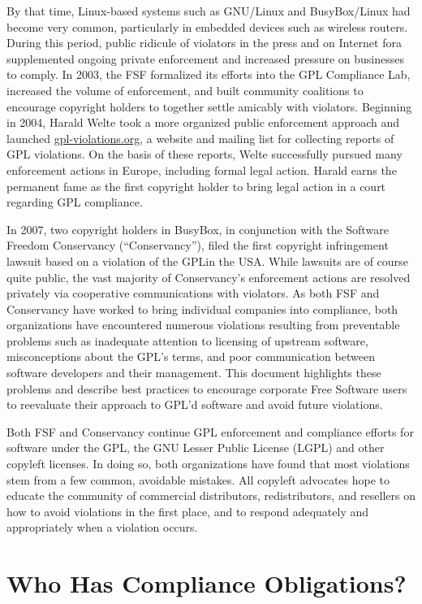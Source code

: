 By that time, Linux-based systems such as GNU/Linux and BusyBox/Linux had become very common, particularly in
embedded devices such as wireless routers.  During this period, public
ridicule of violators in the press and on Internet fora supplemented
ongoing private enforcement and increased pressure on businesses to
comply.  In 2003, the FSF formalized its efforts into the GPL Compliance
Lab, increased the volume of enforcement, and built community coalitions
to encourage copyright holders to together settle amicably with violators.
Beginning in 2004, Harald Welte took a more organized public enforcement
approach and launched \href{http://gpl-violations.org/}{gpl-violations.org}, a website and mailing
list for collecting reports of GPL violations.  On the basis of these
reports, Welte successfully pursued many enforcement actions in Europe, including
formal legal action.  Harald earns the permanent fame as the first copyright
holder to bring legal action in a court regarding GPL compliance.

In 2007, two copyright holders in BusyBox, in conjunction with the
Software Freedom Conservancy (``Conservancy''), filed the first copyright infringement lawsuit
based on a violation of the GPL\@ in the USA. While  lawsuits are of course
quite public, the vast majority of Conservancy's enforcement actions 
are resolved privately via
cooperative communications with violators.  As both FSF and Conservancy have worked to bring
individual companies into compliance, both organizations have encountered numerous
violations resulting from preventable problems such as inadequate
attention to licensing of upstream software, misconceptions about the
GPL's terms, and poor communication between software developers and their
management.  This document highlights these problems and describe
best practices to encourage corporate Free Software users to reevaluate their
approach to GPL'd software and avoid future violations.

Both FSF and Conservancy continue GPL enforcement and compliance efforts
for software under the GPL, the GNU Lesser
Public License (LGPL) and other copyleft licenses.  In doing so, both organizations have
found that most violations stem from a few common, avoidable mistakes.  All copyleft advocates  hope to educate the community of
commercial distributors, redistributors, and resellers on how to avoid
violations in the first place, and to respond adequately and appropriately
when a violation occurs.

\section{Who Has Compliance Obligations?}

